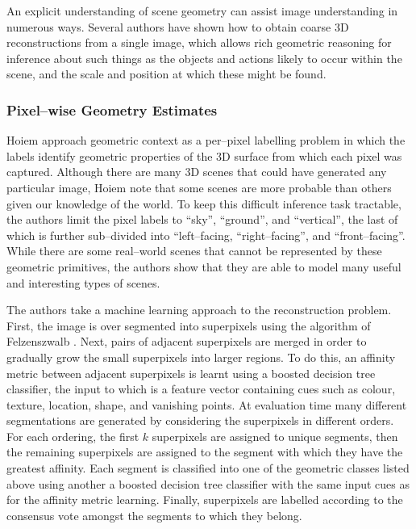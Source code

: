 An explicit understanding of scene geometry can assist image
understanding in numerous ways. Several authors have shown how to
obtain coarse 3D reconstructions from a single image, which allows
rich geometric reasoning for inference about such things as the
objects and actions likely to occur within the scene, and the scale
and position at which these might be found.

\subsubsection{Pixel--wise Geometry Estimates}

Hoiem \etal \cite{Hoiem06} approach geometric context as a per--pixel
labelling problem in which the labels identify geometric properties of
the 3D surface from which each pixel was captured. Although there are
many 3D scenes that could have generated any particular image, Hoiem
\etal note that some scenes are more probable than others given our
knowledge of the world. To keep this difficult inference task
tractable, the authors limit the pixel labels to ``sky'', ``ground'',
and ``vertical'', the last of which is further sub--divided into
``left--facing, ``right--facing'', and ``front--facing''. While there
are some real--world scenes that cannot be represented by these
geometric primitives, the authors show that they are able to model
many useful and interesting types of scenes.

The authors take a machine learning approach to the reconstruction
problem. First, the image is over segmented into superpixels using the
algorithm of Felzenszwalb \etal \cite{Felzenszwalb04}. Next, pairs of
adjacent superpixels are merged in order to gradually grow the small
superpixels into larger regions. To do this, an affinity metric
between adjacent superpixels is learnt using a boosted decision tree
classifier, the input to which is a feature vector containing cues
such as colour, texture, location, shape, and vanishing points. At
evaluation time many different segmentations are generated by
considering the superpixels in different orders. For each ordering,
the first $k$ superpixels are assigned to unique segments, then the
remaining superpixels are assigned to the segment with which they have
the greatest affinity. Each segment is classified into one of the
geometric classes listed above using another a boosted decision tree
classifier with the same input cues as for the affinity metric
learning. Finally, superpixels are labelled according to the consensus
vote amongst the segments to which they belong.

